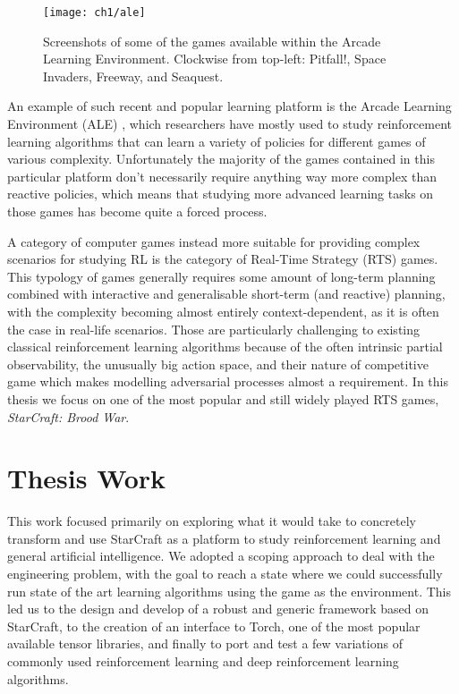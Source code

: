 \begin{figure}[h]
    \centering
    \texttt{[image: ch1/ale]}
    \caption{Screenshots of some of the games available within the Arcade
      Learning Environment. Clockwise from top-left: Pitfall!, Space Invaders,
      Freeway, and Seaquest.}
    \label{fig:ALE}
\end{figure}

An example of such recent and popular learning platform is the Arcade Learning
Environment (ALE) \citep{bellemare2012arcade}, which researchers have mostly
used to study reinforcement learning algorithms that can learn a variety of
policies for different games of various complexity. Unfortunately the majority
of the games contained in this particular platform don't necessarily require
anything way more complex than reactive policies, which means that studying more
advanced learning tasks on those games has become quite a forced process.

A category of computer games instead more suitable for providing complex
scenarios for studying RL is the category of Real-Time Strategy (RTS) games.
This typology of games generally requires some amount of long-term planning
combined with interactive and generalisable short-term (and reactive) planning,
with the complexity becoming almost entirely context-dependent, as it is often
the case in real-life scenarios. Those are particularly challenging to existing
classical reinforcement learning algorithms because of the often intrinsic
partial observability, the unusually big action space, and their nature of
competitive game which makes modelling adversarial processes almost a
requirement. In this thesis we focus on one of the most popular and still widely
played RTS games, \emph{StarCraft: Brood War}.


\section{Thesis Work}

This work focused primarily on exploring what it would take to concretely
transform and use StarCraft as a platform to study reinforcement learning and
general artificial intelligence. We adopted a scoping approach to deal with the
engineering problem, with the goal to reach a state where we could successfully
run state of the art learning algorithms using the game as the environment. This
led us to the design and develop of a robust and generic framework based on
StarCraft, to the creation of an interface to Torch, one of the most popular
available tensor libraries, and finally to port and test a few variations of
commonly used reinforcement learning and deep reinforcement learning algorithms.

